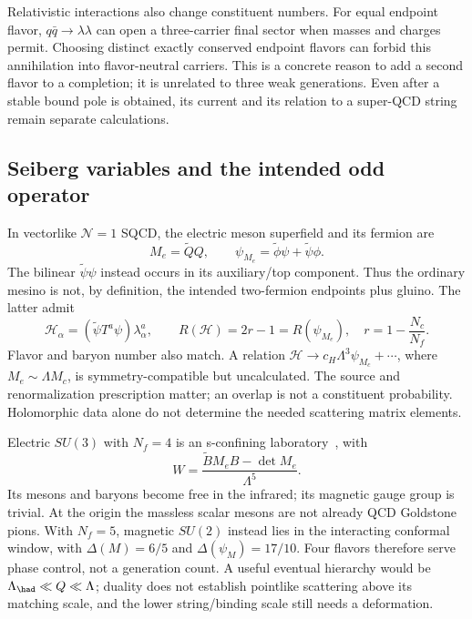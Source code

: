 Relativistic interactions also change constituent numbers. For equal endpoint flavor, $q\bar q\to\lambda\lambda$ can open a three-carrier final sector when masses and charges permit. Choosing distinct exactly conserved endpoint flavors can forbid this annihilation into flavor-neutral carriers. This is a concrete reason to add a second flavor to a completion; it is unrelated to three weak generations. Even after a stable bound pole is obtained, its current and its relation to a super-QCD string remain separate calculations.

\subsection{Seiberg variables and the intended odd operator}
In vectorlike $\mathcal N=1$ SQCD, the electric meson superfield and its fermion are
\begin{equation}
 M_e=\widetilde Q Q,\qquad
 \psi_{M_e}=\widetilde\phi\psi+\widetilde\psi\phi.
\end{equation}
The bilinear $\widetilde\psi\psi$ instead occurs in its auxiliary/top component. Thus the ordinary mesino is not, by definition, the intended two-fermion endpoints plus gluino. The latter admit
\begin{equation}
 \mathcal H_\alpha=(\widetilde\psi T^a\psi)\lambda^a_\alpha,
 \qquad R(\mathcal H)=2r-1=R(\psi_{M_e}),\quad r=1-\frac{N_c}{N_f}.
\end{equation}
Flavor and baryon number also match. A relation $\mathcal H\to c_H\Lambda^3\psi_{M_c}+\cdots$, where $M_e\sim\Lambda M_c$, is symmetry-compatible but uncalculated. The source and renormalization prescription matter; an overlap is not a constituent probability. Holomorphic data alone do not determine the needed scattering matrix elements.

Electric $SU(3)$ with $N_f=4$ is an s-confining laboratory~\cite{Seiberg}, with
\begin{equation}
 W=\frac{\widetilde B M_e B-\det M_e}{\Lambda^5}.
\end{equation}
Its mesons and baryons become free in the infrared; its magnetic gauge group is trivial. At the origin the massless scalar mesons are not already QCD Goldstone pions. With $N_f=5$, magnetic $SU(2)$ instead lies in the interacting conformal window, with $\Delta(M)=6/5$ and $\Delta(\psi_M)=17/10$. Four flavors therefore serve phase control, not a generation count. A useful eventual hierarchy would be $\Lambda_{\had}\ll Q\ll\Lambda$; duality does not establish pointlike scattering above its matching scale, and the lower string/binding scale still needs a deformation.

